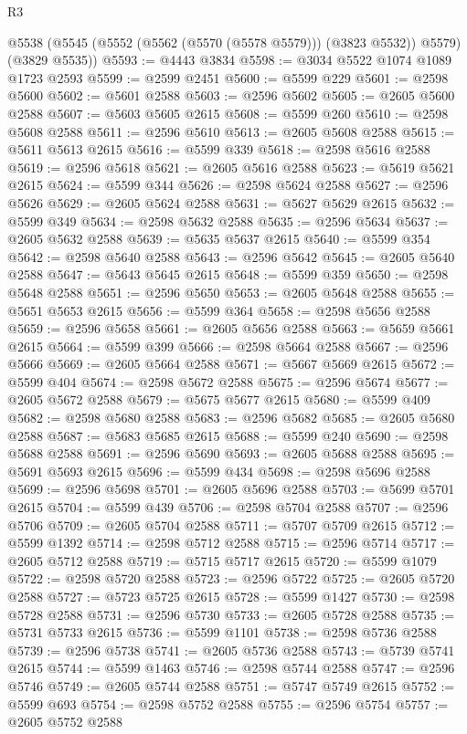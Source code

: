 \begin{lexlean}{R3}
\begin{coremodule}
    @5538 (@5545 (@5552 (@5562 (@5570 (@5578 @5579))) (@3823 @5532)) @5579) (@3829 @5535))
@5593 := @4443 @3834
@5598 := @3034 @5522 @1074 @1089 @1723 @2593
@5599 := @2599 @2451
@5600 := @5599 @229
@5601 := @2598 @5600
@5602 := @5601 @2588
@5603 := @2596 @5602
@5605 := @2605 @5600 @2588
@5607 := @5603 @5605 @2615
@5608 := @5599 @260
@5610 := @2598 @5608 @2588
@5611 := @2596 @5610
@5613 := @2605 @5608 @2588
@5615 := @5611 @5613 @2615
@5616 := @5599 @339
@5618 := @2598 @5616 @2588
@5619 := @2596 @5618
@5621 := @2605 @5616 @2588
@5623 := @5619 @5621 @2615
@5624 := @5599 @344
@5626 := @2598 @5624 @2588
@5627 := @2596 @5626
@5629 := @2605 @5624 @2588
@5631 := @5627 @5629 @2615
@5632 := @5599 @349
@5634 := @2598 @5632 @2588
@5635 := @2596 @5634
@5637 := @2605 @5632 @2588
@5639 := @5635 @5637 @2615
@5640 := @5599 @354
@5642 := @2598 @5640 @2588
@5643 := @2596 @5642
@5645 := @2605 @5640 @2588
@5647 := @5643 @5645 @2615
@5648 := @5599 @359
@5650 := @2598 @5648 @2588
@5651 := @2596 @5650
@5653 := @2605 @5648 @2588
@5655 := @5651 @5653 @2615
@5656 := @5599 @364
@5658 := @2598 @5656 @2588
@5659 := @2596 @5658
@5661 := @2605 @5656 @2588
@5663 := @5659 @5661 @2615
@5664 := @5599 @399
@5666 := @2598 @5664 @2588
@5667 := @2596 @5666
@5669 := @2605 @5664 @2588
@5671 := @5667 @5669 @2615
@5672 := @5599 @404
@5674 := @2598 @5672 @2588
@5675 := @2596 @5674
@5677 := @2605 @5672 @2588
@5679 := @5675 @5677 @2615
@5680 := @5599 @409
@5682 := @2598 @5680 @2588
@5683 := @2596 @5682
@5685 := @2605 @5680 @2588
@5687 := @5683 @5685 @2615
@5688 := @5599 @240
@5690 := @2598 @5688 @2588
@5691 := @2596 @5690
@5693 := @2605 @5688 @2588
@5695 := @5691 @5693 @2615
@5696 := @5599 @434
@5698 := @2598 @5696 @2588
@5699 := @2596 @5698
@5701 := @2605 @5696 @2588
@5703 := @5699 @5701 @2615
@5704 := @5599 @439
@5706 := @2598 @5704 @2588
@5707 := @2596 @5706
@5709 := @2605 @5704 @2588
@5711 := @5707 @5709 @2615
@5712 := @5599 @1392
@5714 := @2598 @5712 @2588
@5715 := @2596 @5714
@5717 := @2605 @5712 @2588
@5719 := @5715 @5717 @2615
@5720 := @5599 @1079
@5722 := @2598 @5720 @2588
@5723 := @2596 @5722
@5725 := @2605 @5720 @2588
@5727 := @5723 @5725 @2615
@5728 := @5599 @1427
@5730 := @2598 @5728 @2588
@5731 := @2596 @5730
@5733 := @2605 @5728 @2588
@5735 := @5731 @5733 @2615
@5736 := @5599 @1101
@5738 := @2598 @5736 @2588
@5739 := @2596 @5738
@5741 := @2605 @5736 @2588
@5743 := @5739 @5741 @2615
@5744 := @5599 @1463
@5746 := @2598 @5744 @2588
@5747 := @2596 @5746
@5749 := @2605 @5744 @2588
@5751 := @5747 @5749 @2615
@5752 := @5599 @693
@5754 := @2598 @5752 @2588
@5755 := @2596 @5754
@5757 := @2605 @5752 @2588

\end{coremodule}
\end{lexlean}
